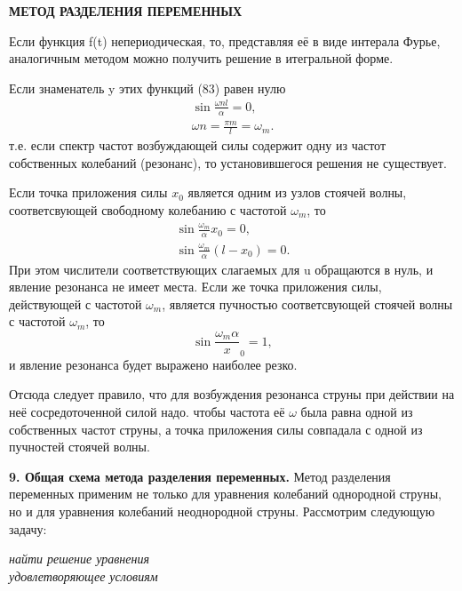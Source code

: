 \documentclass[a4paper, 12pt]{article}
\begin{document}
\newpage

\begin{center}
{\bf МЕТОД РАЗДЕЛЕНИЯ ПЕРЕМЕННЫХ}
\end{center}
Если функция f(t) непериодическая, то, представляя её в виде интерала Фурье, аналогичным методом можно получить решение в итегральной форме.

Если знаменатель y этих функций (83) равен нулю
$$
\begin{aligned}
\sin\frac{\omega nl}{\alpha} = 0,\\
\omega n = \frac{\pi m}{l} = \omega_{m}.
\end{aligned}
$$
т.е. если спектр частот возбуждающей силы содержит одну из частот собственных колебаний (резонанс), то установившегося решения не существует.

Если точка приложения силы $x_{0}$ является одним из узлов стоячей волны, соответсвующей свободному колебанию с частотой $\omega_{m}$, то
$$
\begin{aligned}
\sin\frac{\omega_{m}}{\alpha}x_{0} = 0,\\
\sin\frac{\omega_{m}}{\alpha}(l - x_{0}) = 0.
\end{aligned}
$$
При этом числители соответствующих слагаемых для u обращаются в нуль, и явление резонанса не имеет места. Если же точка приложения силы, действующей с частотой $\omega_{m}$, является пучностью соответсвующей стоячей волны с частотой $\omega_{m}$, то
$$
\sin\frac{\omega_{m}{\alpha}}x_{0} = 1,
$$
и явление резонанса будет выражено наиболее резко.

Отсюда следует правило, что для возбуждения резонанса струны при действии на неё сосредоточенной силой надо. чтобы частота её $\omega$ была равна одной из собственных частот струны, а точка приложения силы совпадала с одной из пучностей стоячей волны.

\textbf{9. Общая схема метода разделения переменных.} Метод разделения переменных применим не только для уравнения колебаний однородной струны, но и для уравнения колебаний неоднородной струны. Рассмотрим следующую задачу:

\textit{найти решение уравнения}
$$
$$
\textit{удовлетворяющее условиям}
\end{document}
